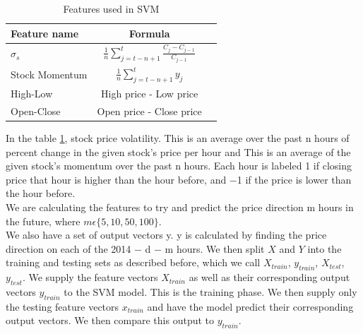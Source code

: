 \usepackage{fancyhdr}\documentclass[conference]{IEEEtran}
\begin{document}
\begin{table}[ht]\label{tab:SVM_TAb}
\centering
\caption{Features used in SVM}
\begin{tabular}[t]{lcc}
\hline
Feature name &  Formula\\
\hline
$\sigma_s$&$\frac{1}{n}\sum_{j=t-n+1}^{t} \frac{C_j-C_{j-1}}{C_{j-1}}$\\
Stock Momentum &$\frac{1}{n}\sum_{j=t-n+1}^{t} y_j$\\
High-Low&High price - Low price\\
Open-Close& Open price - Close price
\hline
\end{tabular}

\end{table}%
In the table \ref{tab:SVM_TAb},  stock price volatility. This is an average over the past n hours of percent change in the given stock’s price per hour and This is an average of the given stock’s momentum over the past n hours. Each hour is labeled 1 if closing price that hour is higher than the hour before, and −1 if the price is lower than the hour before.
\\
We are calculating the features to try and predict the price direction m hours in the future, where $m \epsilon \{ 5, 10, 50, 100\}$.
\\
We also have a set of output vectors y. y is calculated by finding the price direction on each of the 2014 − d − m hours. We then split $X$ and $Y$ into the training and testing sets as described before, which we call $X_{train}$, $y_{train}$, $X_{test}$, $y_{test}$. We supply the feature vectors $X_{train}$ as well as their corresponding output vectors $y_{train}$ to the SVM model. This is the training phase. We then supply only the testing feature vectors $x_{train}$ and have the model predict their corresponding output vectors. We then compare this output to $y_{train}$.
\end{document}
